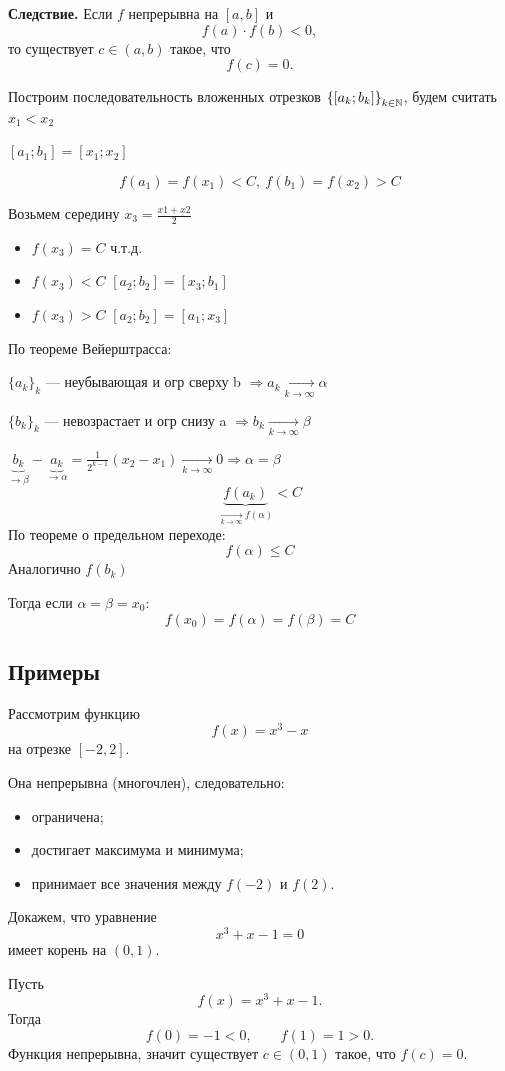 {\bf Следствие.} Если $f$ непрерывна на $[a,b]$ и
\[
f(a)\cdot f(b)<0,
\]
то существует $c\in(a,b)$ такое, что
\[
f(c)=0.
\]

\begin{Proof}
Построим последовательность вложенных отрезков $\left\{[a_k; b_k] \right\}_{k \in \mathbb{N}}$, будем считать $x_1 < x_2$

$[a_1; b_1] = [x_1; x_2]$

\[
    f(a_1) = f(x_1) < C,\ f(b_1) = f(x_2) > C
\]

Возьмем середину $x_3 = \frac{x1 + x2}{2}$

\begin{itemize}
    \item[1.] $f(x_3) = C$ ч.т.д.
    \item[2.] $f(x_3) < C$ $[a_2; b_2] = [x_3; b_1]$
    \item[3.] $f(x_3) > C$ $[a_2; b_2] = [a_1; x_3]$
\end{itemize}

По теореме Вейерштрасса:

$\{a_k\}_k$ --- неубывающая и огр сверху b $\Rightarrow a_k \xrightarrow[k \to \infty ]{} \alpha $

$\{b_k\}_k$ --- невозрастает и огр снизу a $\Rightarrow b_k \xrightarrow[k \to \infty ]{} \beta $

$\underbrace{b_k}_{\to \beta } - \underbrace{a_k}_{\to \alpha } = \frac{1}{2^{k - 1}} (x_2 - x_1) \underset{k \to \infty}{\to} 0 \Rightarrow \alpha = \beta $
\[
    \underbrace{f(a_k)}_{\xrightarrow[k \to \infty ]{} f(\alpha) } < C
\]
По теореме о предельном переходе:
\[
    f(\alpha) \leq C
\]
Аналогично $f(b_k)$

Тогда если $\alpha = \beta = x_0$:
\[
    f(x_0) = f(\alpha) = f(\beta) = C
\]
\end{Proof}

\subsection{Примеры}

\begin{example}
Рассмотрим функцию
\[
f(x)=x^3-x
\]
на отрезке $[-2,2]$.

Она непрерывна (многочлен), следовательно:
\begin{itemize}
\item ограничена;
\item достигает максимума и минимума;
\item принимает все значения между $f(-2)$ и $f(2)$.
\end{itemize}
\end{example}

\begin{example}
Докажем, что уравнение
\[
x^3+x-1=0
\]
имеет корень на $(0,1)$.

Пусть
\[
f(x)=x^3+x-1.
\]
Тогда
\[
f(0)=-1<0,
\qquad
f(1)=1>0.
\]
Функция непрерывна, значит существует
$c\in(0,1)$ такое, что $f(c)=0$.
\end{example}
